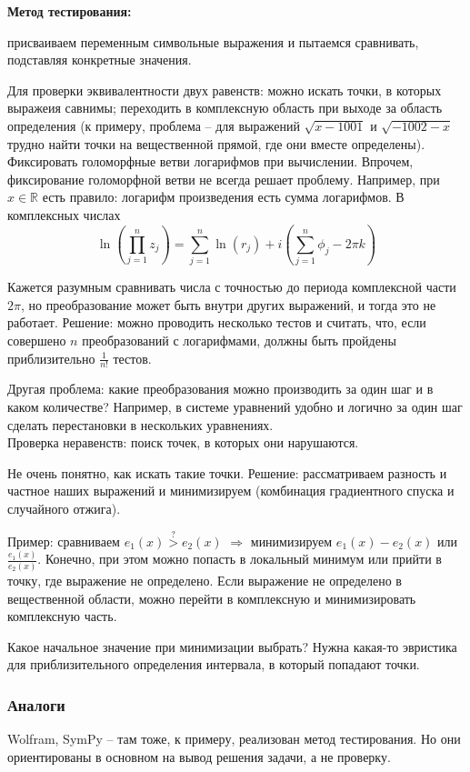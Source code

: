 \documentclass[main.tex]{subfiles}
\begin{document}
\textbf{Метод тестирования:}

присваиваем переменным символьные выражения и пытаемся сравнивать, подставляя конкретные значения.

Для проверки эквивалентности двух равенств: можно искать точки, в которых выражеия савнимы; переходить в комплексную область при выходе за область определения (к примеру, проблема -- для выражений $ \sqrt{x - 1001} $ и $ \sqrt{ -1002 - x } $ трудно найти точки на вещественной прямой, где они вместе определены).
Фиксировать голоморфные ветви логарифмов при вычислении.
Впрочем, фиксирование голоморфной ветви не всегда решает проблему.
Например, при $ x \in \mathds{R} $ есть правило: логарифм произведения есть сумма логарифмов.
В комплексных числах
\[ \ln \left( \prod_{j=1}^{n} z_j \right) = \sum_{j=1}^{n} \ln (r_j) + i \left( \sum_{j=1}^n \phi_j - 2 \pi k \right) \]

Кажется разумным сравнивать числа с точностью до периода комплексной части $ 2 \pi $, но преобразование может быть внутри других выражений, и тогда это не работает.
Решение: можно проводить несколько тестов и считать, что, если совершено $ n $ преобразований с логарифмами, должны быть пройдены приблизительно $ \frac{1}{n!} $ тестов.

Другая проблема: какие преобразования можно производить за один шаг и в каком количестве?
Например, в системе уравнений удобно и логично за один шаг сделать перестановки в нескольких уравнениях. \\

Проверка неравенств:
поиск точек, в которых они нарушаются.

Не очень понятно, как искать такие точки.
Решение: рассматриваем разность и частное наших выражений и минимизируем (комбинация градиентного спуска и случайного отжига).

Пример: сравниваем $ e_1(x) \overset{?}> e_2(x) $ $ \Rightarrow $ минимизируем $ e_1(x) - e_2(x) $ или  $ \frac{e_1(x)}{e_2(x)}  $.
Конечно, при этом можно попасть в локальный минимум или прийти в точку, где выражение не определено.
Если выражение не определено в вещественной области, можно перейти в комплексную и минимизировать комплексную часть.

Какое начальное значение при минимизации выбрать?
Нужна какая-то эвристика для приблизительного определения интервала, в который попадают точки.

\subsubsection{ Аналоги }
Wolfram, SymPy -- там тоже, к примеру, реализован метод тестирования.
Но они ориентированы в основном на вывод решения задачи, а не проверку.
\end{document}
